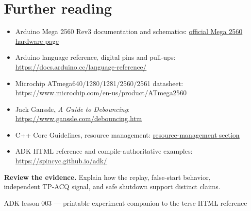 \documentclass[11pt]{article}
\begin{document}
\section{Further reading}

\begin{itemize}
  \item Arduino Mega 2560 Rev3 documentation and schematics:
        \href{https://docs.arduino.cc/hardware/mega-2560/}{official Mega 2560 hardware page}
  \item Arduino language reference, digital pins and pull-ups:
        \url{https://docs.arduino.cc/language-reference/}
  \item Microchip ATmega640/1280/1281/2560/2561 datasheet:
        \url{https://www.microchip.com/en-us/product/ATmega2560}
  \item Jack Ganssle, \textit{A Guide to Debouncing}:
        \url{https://www.ganssle.com/debouncing.htm}
  \item C++ Core Guidelines, resource management:
        \href{https://isocpp.github.io/CppCoreGuidelines/CppCoreGuidelines\#S-resource}{resource-management section}
  \item ADK HTML reference and compile-authoritative examples:
        \url{https://spincyc.github.io/adk/}
\end{itemize}

\textbf{Review the evidence.}
Explain how the replay, false-start behavior, independent TP-ACQ signal, and
safe shutdown support distinct claims.

\vfill
\begin{center}
\small ADK lesson 003 --- printable experiment companion to the terse HTML reference
\end{center}
\end{document}
